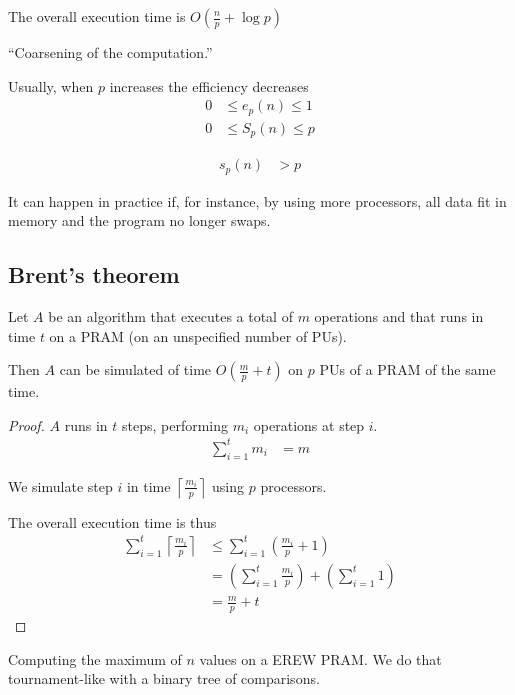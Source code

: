 The overall execution time is $O\left(\frac{n}{p} + \log p\right)$

``Coarsening of the computation.''

 Usually, when $p$ increases the efficiency decreases
\begin{align*}
0 &\leq e_p(n) \leq 1\\
0 &\leq S_p(n) \leq p
\end{align*}

\begin{align*}
s_p(n) & > p
\end{align*}

It can happen in practice if, for instance, by using more processors, all data fit in memory and the program no longer swaps.


\subsection{Brent's theorem}

\begin{thm}
Let $A$ be an algorithm that executes a total of $m$
 operations and that runs in time $t$ on a PRAM (on an unspecified number of PUs).

Then $A$ can be simulated of time $O\left( \frac{m}{p}+t\right)$ on $p$ PUs of a PRAM of the same time.
\end{thm}

\begin{proof}
$A$ runs in $t$ steps, performing $m_i$ operations at step $i$.
\begin{align*}
\sum_{i=1}^t m_i & = m
\end{align*}

We simulate step $i$ in time $\left\lceil \frac{m_i}{p}\right\rceil$ using $p$ processors.

The overall execution time is thus 
\begin{align*}
\sum_{i=1}^t \left\lceil \frac{m_i}{p}\right\rceil & \leq \sum_{i=1}^t \left(\frac{m_i}{p}+1\right)\\
& = \left( \sum_{i=1}^t \frac{m_i}{p}\right) + \left( \sum_{i=1}^t 1\right)\\
& = \frac{m}{p} + t
\end{align*}
\end{proof}

Computing the maximum of $n$ values on a EREW PRAM. We do that tournament-like with a binary tree of comparisons.

